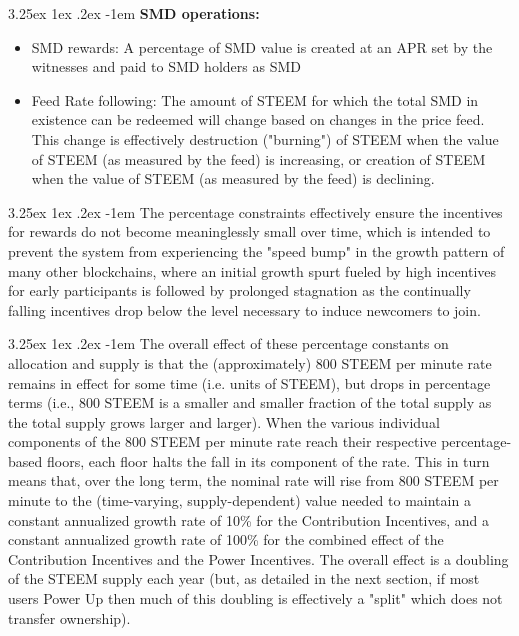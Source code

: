 \documentclass{article}
\makeatletter
\renewcommand\paragraph{\@startsection{paragraph}{5}{\z@}%
  {3.25ex \@plus1ex \@minus.2ex}%
  {-1em}%
  {\normalfont\normalsize\bfseries}}
\makeatother
\begin{document}
		\paragraph{}
			\textbf{SMD operations:}

		\begin{itemize}
			\item SMD rewards: A percentage of SMD value is created at an APR set by the witnesses and paid to SMD holders as SMD
			\item Feed Rate following: The amount of STEEM for which the total SMD in existence can be redeemed will change based on changes in the price feed. This change is effectively destruction ("burning") of STEEM when the value of STEEM (as measured by the feed) is increasing, or creation of STEEM when the value of STEEM (as measured by the feed) is declining.
		\end{itemize}

		\paragraph{}
			The percentage constraints effectively ensure the incentives for rewards do not become meaninglessly small over time, which is intended to prevent the system from experiencing the "speed bump" in the growth pattern of many other blockchains, where an initial growth spurt fueled by high incentives for early participants is followed by prolonged stagnation as the continually falling incentives drop below the level necessary to induce newcomers to join.

		\paragraph{}
			The overall effect of these percentage constants on allocation and supply is that the (approximately) 800 STEEM per minute rate remains in effect for some time (i.e. units of STEEM), but drops in percentage terms (i.e., 800 STEEM is a smaller and smaller fraction of the total supply as the total supply grows larger and larger). When the various individual components of the 800 STEEM per minute rate reach their respective percentage-based floors, each floor halts the fall in its component of the rate. This in turn means that, over the long term, the nominal rate will rise from 800 STEEM per minute to the (time-varying, supply-dependent) value needed to maintain a constant annualized growth rate of 10\% for the Contribution Incentives, and a constant annualized growth rate of 100\% for the combined effect of the Contribution Incentives and the Power Incentives. The overall effect is a doubling of the STEEM supply each year (but, as detailed in the next section, if most users Power Up then much of this doubling is effectively a "split" which does not transfer ownership).
\end{document}

